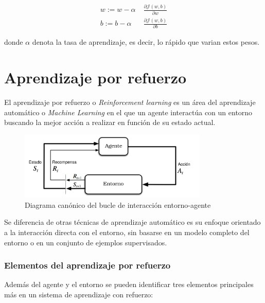  \begin{align}
 	w:= w - \alpha\; &\frac{\partial\mathcal{J}(w,b)}{\partial w}\\
 	b:= b - \alpha\; &\frac{\partial\mathcal{J}(w,b)}{\partial b}
 \end{align}
 
 donde $\alpha$ denota la tasa de aprendizaje, es decir, lo rápido que varian estos pesos.

 



\section{Aprendizaje por refuerzo}

El aprendizaje por refuerzo o \textit{Reinforcement learning} \cite{sutton2018reinforcement} es un área del aprendizaje automático o \textit{Machine Learning} en el que un agente interactúa con un entorno buscando la mejor acción a realizar en función de su estado actual.


\begin{figure}[htb!]
	\centering
	\includegraphics[width=0.8\textwidth]{background/RL_diagram}
	\caption{Diagrama canónico del bucle de interacción entorno-agente}
	\label{hardware:droneImg}
\end{figure}


Se diferencia de otras técnicas de aprendizaje automático es su enfoque orientado a la interacción directa con el entorno, sin basarse en un modelo completo del entorno o en un conjunto de ejemplos supervisados.

\subsubsection{Elementos del aprendizaje por refuerzo}
Además del agente y el entorno se pueden identificar tres elementos principales más en un sistema de aprendizaje con refuerzo:

